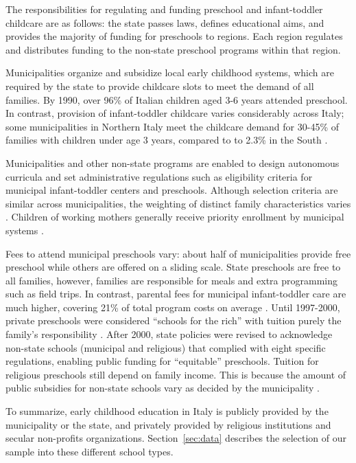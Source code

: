 The responsibilities for regulating and funding preschool and infant-toddler childcare are as follows: the state passes laws, defines educational aims, and provides the majority of funding for preschools to regions. Each region regulates and distributes funding to the non-state preschool programs within that region. 

Municipalities organize and subsidize local early childhood systems, which are required by the state to provide childcare slots to meet the demand of all families. By 1990, over 96\% of Italian children aged 3-6 years attended preschool. In contrast, provision of infant-toddler childcare varies considerably across Italy; some municipalities in Northern Italy meet the childcare demand for 30-45\% of families with children under age 3 years, compared to to 2.3\% in the South \citep{Becchi-Ferrari_1990_Pub-Inf-Centres-Italy,Musatti-Picchio_2010_IJEC}. 

Municipalities and other non-state programs are enabled to design autonomous curricula and set administrative regulations such as eligibility criteria for municipal infant-toddler centers and preschools. Although selection criteria are similar across municipalities, the weighting of distinct family characteristics varies \citep{Del-Boca-etal_2016_CESifo-ES}. Children of working mothers generally receive priority enrollment by municipal systems \citep{Saraceno_1984_Soc-Probs}.

Fees to attend municipal preschools vary: about half of municipalities provide free preschool while others are offered on a sliding scale. State preschools are free to all families, however, families are responsible for meals and extra programming such as field trips. In contrast, parental fees for municipal infant-toddler care are much higher, covering 21\% of total program costs on average \citep{Musatti-Picchio_2010_IJEC}. Until 1997-2000, private preschools were considered ``schools for the rich'' with tuition purely the family's responsibility \citep{Ribolzi_2013_Italy}. After 2000, state policies were revised to acknowledge non-state schools (municipal and religious) that complied with eight specific regulations, enabling public funding for ``equitable'' preschools. Tuition for religious preschools still depend on family income. This is because the amount of public subsidies for non-state schools vary as decided by the municipality \citep{Hohnerlein_2009_Paradox-Public-Preschools,Ribolzi_2013_Italy}.

To summarize, early childhood education in Italy is publicly provided by the municipality or the state, and privately provided by religious institutions and secular non-profits organizations. Section~\ref{sec:data} describes the selection of our sample into these different school types.

